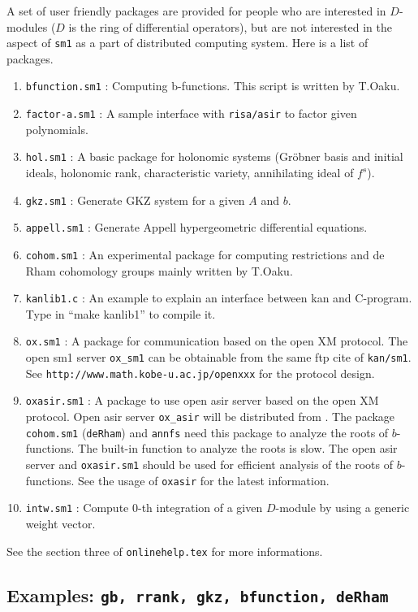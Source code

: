 \documentclass{article}
\begin{document}
A set of user friendly packages are provided
for people who are interested in $D$-modules
($D$ is the ring of differential operators), but
are not interested in the aspect of {\tt sm1}
as a part of distributed computing system.
Here is a list of packages.
\begin{enumerate}
\item {\tt bfunction.sm1} : Computing b-functions.
                        This script is written by T.Oaku.
\item{\tt factor-a.sm1} : A sample interface with {\tt risa/asir} \cite{asir}
to factor given polynomials.
\item{\tt hol.sm1} : A basic package for holonomic systems (Gr\"obner basis and
initial ideals, holonomic rank, characteristic variety, annihilating ideal
of $f^s$).
\item{\tt gkz.sm1} : Generate GKZ system for a given $A$ and $b$.
\item{\tt appell.sm1} : Generate Appell hypergeometric differential equations.
\item{\tt cohom.sm1} : An experimental package for computing restrictions
and de Rham cohomology groups mainly written by T.Oaku.
\item {\tt kanlib1.c} : An example to explain an interface between kan and
 C-program. Type in ``make kanlib1'' to compile it.
\item{\tt ox.sm1} : A package for communication based on the open XM protocol.
The open sm1 server {\tt ox\_sm1} can be obtainable from the same ftp cite
of {\tt kan/sm1}.
See {\tt http://www.math.kobe-u.ac.jp/openxxx} for the protocol design.
\item{\tt oxasir.sm1} : A package to use open asir server based on the open
                        XM protocol.
Open asir server {\tt ox\_asir} will be distributed from \cite{asir}.
The package {\tt cohom.sm1} ({\tt deRham}) and {\tt annfs} need this package 
to analyze the roots of $b$-functions.
The built-in function to analyze the roots is slow. The open asir server
and {\tt oxasir.sm1} should be used for efficient analysis of the roots
of $b$-functions.
See the usage of {\tt oxasir} for the latest information.
\item{\tt intw.sm1} : Compute $0$-th integration of a given $D$-module
by using a generic weight vector.
\end{enumerate}

See the section three of {\tt onlinehelp.tex} for more informations.

\subsection{Examples: {\tt gb, rrank, gkz, bfunction, deRham}}
\end{document}
